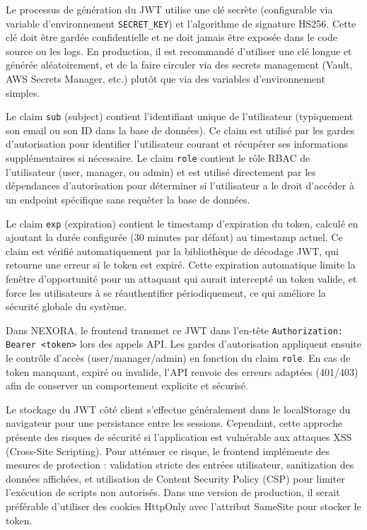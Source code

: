 \documentclass[12pt,a4paper]{report}
\begin{document}
Le processus de génération du JWT utilise une clé secrète (configurable via variable d'environnement \texttt{SECRET\_KEY}) et l'algorithme de signature HS256. Cette clé doit être gardée confidentielle et ne doit jamais être exposée dans le code source ou les logs. En production, il est recommandé d'utiliser une clé longue et générée aléatoirement, et de la faire circuler via des secrets management (Vault, AWS Secrets Manager, etc.) plutôt que via des variables d'environnement simples.

Le claim \texttt{sub} (subject) contient l'identifiant unique de l'utilisateur (typiquement son email ou son ID dans la base de données). Ce claim est utilisé par les gardes d'autorisation pour identifier l'utilisateur courant et récupérer ses informations supplémentaires si nécessaire. Le claim \texttt{role} contient le rôle RBAC de l'utilisateur (user, manager, ou admin) et est utilisé directement par les dépendances d'autorisation pour déterminer si l'utilisateur a le droit d'accéder à un endpoint spécifique sans requêter la base de données.

Le claim \texttt{exp} (expiration) contient le timestamp d'expiration du token, calculé en ajoutant la durée configurée (30 minutes par défaut) au timestamp actuel. Ce claim est vérifié automatiquement par la bibliothèque de décodage JWT, qui retourne une erreur si le token est expiré. Cette expiration automatique limite la fenêtre d'opportunité pour un attaquant qui aurait intercepté un token valide, et force les utilisateurs à se réauthentifier périodiquement, ce qui améliore la sécurité globale du système.

Dans NEXORA, le frontend transmet ce JWT dans l'en-tête \texttt{Authorization: Bearer <token>} lors des appels API. Les gardes d'autorisation appliquent ensuite le contrôle d'accès (user/manager/admin) en fonction du claim \texttt{role}. En cas de token manquant, expiré ou invalide, l'API renvoie des erreurs adaptées (401/403) afin de conserver un comportement explicite et sécurisé.

Le stockage du JWT côté client s'effectue généralement dans le localStorage du navigateur pour une persistance entre les sessions. Cependant, cette approche présente des risques de sécurité si l'application est vulnérable aux attaques XSS (Cross-Site Scripting). Pour atténuer ce risque, le frontend implémente des mesures de protection : validation stricte des entrées utilisateur, sanitization des données affichées, et utilisation de Content Security Policy (CSP) pour limiter l'exécution de scripts non autorisés. Dans une version de production, il serait préférable d'utiliser des cookies HttpOnly avec l'attribut SameSite pour stocker le token.
\end{document}
